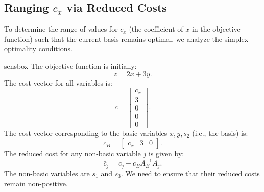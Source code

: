 \subsection{Ranging \( c_x \) via Reduced Costs}

To determine the range of values for \( c_x \) (the coefficient of \( x \) in the objective function) such that the current basis remains optimal, we analyze the simplex optimality conditions.

\begin{steppanel}{sensbox}
The objective function is initially:
\[
    z = 2x + 3y.
\]
The cost vector for all variables is:
\[
    c = \begin{bmatrix} c_x \\ 3 \\ 0 \\ 0 \\ 0 \end{bmatrix}.
\]
The cost vector corresponding to the basic variables \( x, y, s_2 \) (i.e., the basis) is:
\[
    c_B = \begin{bmatrix} c_x & 3 & 0 \end{bmatrix}.
\]
The reduced cost for any non-basic variable \( j \) is given by:
\[
    \bar{c}_j = c_j - c_B A_B^{-1} A_j.
\]
The non-basic variables are \( s_1 \) and \( s_3 \). We need to ensure that their reduced costs remain non-positive.
\end{steppanel}

